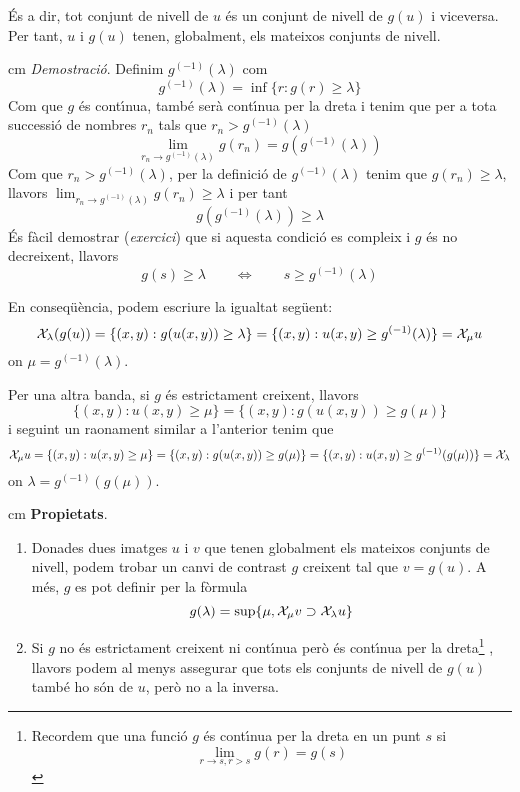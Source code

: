 \documentclass{article}
\begin{document}
\noindent
\'Es a dir, tot conjunt de nivell de $u$ \'es un conjunt de nivell de $g(u)$ i viceversa. Per tant, $u$ i $g(u)$
tenen, globalment, els mateixos conjunts de nivell.

 cm
\noindent
{\it Demostraci\'o}.
Definim $g^{(-1)}(\lambda)$ com
\[
g^{(-1)}(\lambda)=\inf \{ r : g(r) \geq \lambda \}
\]
\noindent
Com que $g$ \'es cont\'\i nua, tamb\'e ser\`a cont\'\i nua per la dreta i tenim que per a tota successi\'o de 
nombres $r_n$ tals que $r_n > g^{(-1)}(\lambda)$
\[
\lim_{r_n \rightarrow g^{(-1)}(\lambda)} g(r_n)=g(g^{(-1)}(\lambda))
\]
\noindent
Com que $r_n > g^{(-1)}(\lambda)$, per la definici\'o de $g^{(-1)}(\lambda)$ tenim que $g(r_n) \geq \lambda$, 
llavors $\lim_{r_n \rightarrow g^{(-1)}(\lambda)} g(r_n) \geq \lambda$ i per tant
\[
g(g^{(-1)}(\lambda)) \geq \lambda
\]
\noindent
\'Es f\`acil demostrar ({\it exercici}) que si aquesta condici\'o es compleix i $g$ \'es no decreixent, llavors 
\[
g(s) \geq \lambda \qquad \Longleftrightarrow \qquad s \geq g^{(-1)}(\lambda) 
\]

\noindent
En conseq\"u\`encia, podem escriure la igualtat seg\"uent:
\[
{\cal X}_\lambda(g(u))= \{ (x, y) : g(u(x, y)) \geq \lambda \}= 
\{ (x, y) : u(x, y) \geq g^{(-1)}(\lambda) \} = {\cal X}_\mu u
\]
\noindent
on $\mu=g^{(-1)}(\lambda)$. 

\noindent
Per una altra banda, si $g$ \'es estrictament creixent, llavors
\[
\{ (x, y) : u(x, y) \geq \mu \} = \{ (x, y) : g(u(x, y)) \geq g(\mu) \}
\]
\noindent
i seguint un raonament similar a l'anterior tenim que
\[
{\cal X}_\mu u = \{ (x, y) : u(x, y) \geq \mu \} = \{ (x, y) : g(u(x, y)) \geq g(\mu) \} =
\{ (x, y) : u(x, y) \geq g^{(-1)}(g(\mu)) \} = {\cal X}_\lambda 
\]
\noindent
on $\lambda = g^{(-1)}(g(\mu))$.

{} cm
\noindent
{\bf Propietats}.
\begin{enumerate}

\item Donades dues imatges $u$ i $v$ que tenen globalment els mateixos conjunts de nivell, podem trobar un
canvi de contrast $g$  creixent tal que $v=g(u)$. A m\'es, $g$ es pot definir per la f\`ormula
\[
g(\lambda)=\sup \{ \mu, {\cal X}_\mu v \supset {\cal X}_\lambda u \}
\] 

\item Si $g$ no \'es estrictament creixent ni cont\'\i nua per\`o \'es cont\'\i nua per la dreta\footnote{Recordem 
que una funci\'o $g$ \'es cont\'\i nua per la dreta en un punt $s$ si
\[
\lim_{r \rightarrow s, r > s} g(r)=g(s)
\]}
, llavors podem al menys assegurar que tots els conjunts de nivell
de $g(u)$ tamb\'e ho s\'on de $u$, per\`o no a la inversa.

\end{enumerate}
\end{document}
